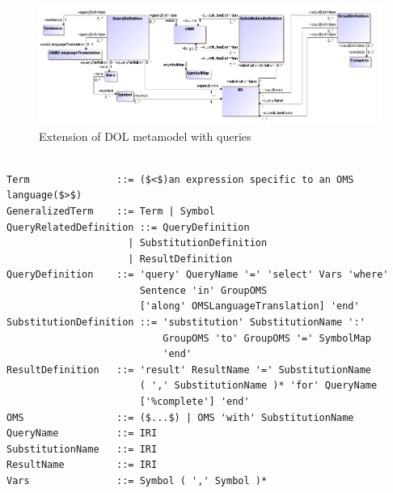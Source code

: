 \documentclass[10pt, a4paper]{isov2}
\begin{document}
\begin{figure}
    \centering
      \includegraphics[scale=0.5]{mof/queries.png}
     \caption{Extension of DOL metamodel with queries}
    \label{fig:queries} 
\end{figure}




\begin{lstlisting}[language=ebnf,escapeinside={()},mathescape]

Term               ::= ($<$)an expression specific to an OMS language($>$) 
GeneralizedTerm    ::= Term | Symbol
QueryRelatedDefinition ::= QueryDefinition
                     | SubstitutionDefinition
                     | ResultDefinition
QueryDefinition    ::= 'query' QueryName '=' 'select' Vars 'where'
                       Sentence 'in' GroupOMS
                       ['along' OMSLanguageTranslation] 'end'
SubstitutionDefinition ::= 'substitution' SubstitutionName ':'
                           GroupOMS 'to' GroupOMS '=' SymbolMap
                           'end'
ResultDefinition   ::= 'result' ResultName '=' SubstitutionName
                       ( ',' SubstitutionName )* 'for' QueryName
                       ['%complete'] 'end'
OMS                ::= ($...$) | OMS 'with' SubstitutionName 
QueryName          ::= IRI
SubstitutionName   ::= IRI
ResultName         ::= IRI
Vars               ::= Symbol ( ',' Symbol )*
\end{lstlisting}

\end{document}
